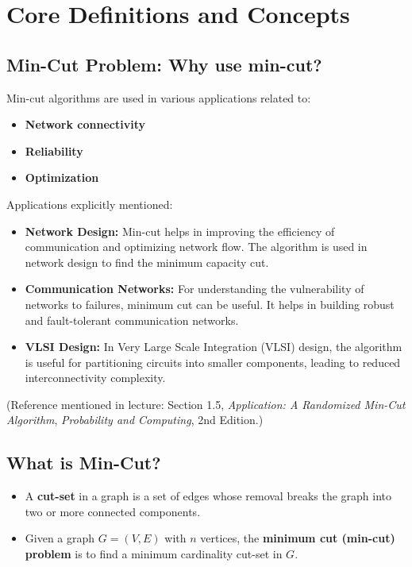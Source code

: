 \documentclass[11pt]{article}
\begin{document}
\section{Core Definitions and Concepts}

\subsection{Min-Cut Problem: Why use min-cut?}

Min-cut algorithms are used in various applications related to:

\begin{itemize}
    \item \textbf{Network connectivity}
    \item \textbf{Reliability}
    \item \textbf{Optimization}
\end{itemize}

Applications explicitly mentioned:

\begin{itemize}
    \item \textbf{Network Design:}  
    Min-cut helps in improving the efficiency of communication and optimizing network flow. The algorithm is used in network design to find the minimum capacity cut.
    \item \textbf{Communication Networks:}  
    For understanding the vulnerability of networks to failures, minimum cut can be useful. It helps in building robust and fault-tolerant communication networks.
    \item \textbf{VLSI Design:}  
    In Very Large Scale Integration (VLSI) design, the algorithm is useful for partitioning circuits into smaller components, leading to reduced interconnectivity complexity.
\end{itemize}

(Reference mentioned in lecture: Section 1.5, \textit{Application: A Randomized Min-Cut Algorithm}, \textit{Probability and Computing}, 2nd Edition.)

\subsection{What is Min-Cut?}

\begin{itemize}
    \item A \textbf{cut-set} in a graph is a set of edges whose removal breaks the graph into two or more connected components.
    \item Given a graph \( G = (V, E) \) with \( n \) vertices, the \textbf{minimum cut (min-cut) problem} is to find a minimum cardinality cut-set in \( G \).
\end{itemize}
\end{document}
